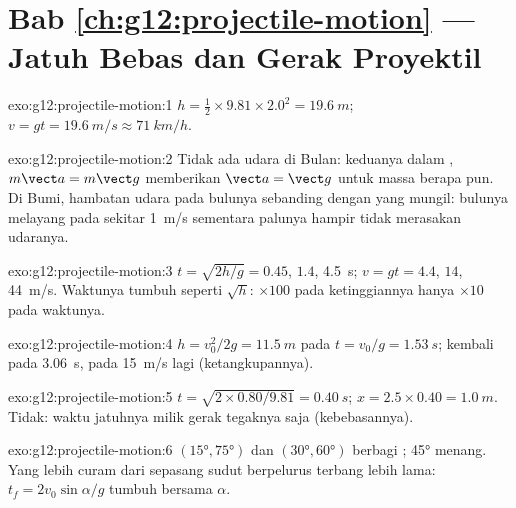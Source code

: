 \section*{Bab \ref{ch:g12:projectile-motion} --- Jatuh Bebas dan Gerak Proyektil}

\begin{solution}{exo:g12:projectile-motion:1}
$h = \tfrac12 \times 9.81 \times 2.0^2 = \qty{19.6}{m}$;
$v = gt = \qty{19.6}{m/s} \approx \qty{71}{km/h}$.
\end{solution}

\begin{solution}{exo:g12:projectile-motion:2}
Tidak ada udara di Bulan: keduanya dalam , $m\vect a = m\vect g$
memberikan $\vect a = \vect g$ untuk massa berapa pun. Di Bumi, hambatan udara
pada bulunya sebanding dengan  yang mungil: bulunya melayang pada  sekitar \qty{1}{m/s} sementara palunya hampir tidak merasakan udaranya.
\end{solution}

\begin{solution}{exo:g12:projectile-motion:3}
$t = \sqrt{2h/g} = 0.45$, $1.4$, \qty{4.5}{s};
$v = gt = 4.4$, $14$, \qty{44}{m/s}. Waktunya tumbuh seperti $\sqrt h$:
$\times 100$ pada ketinggiannya hanya $\times 10$ pada waktunya.
\end{solution}

\begin{solution}{exo:g12:projectile-motion:4}
$h = v_0^2/2g = \qty{11.5}{m}$ pada $t = v_0/g = \qty{1.53}{s}$;
kembali pada \qty{3.06}{s}, pada \qty{15}{m/s} lagi (ketangkupannya).
\end{solution}

\begin{solution}{exo:g12:projectile-motion:5}
$t = \sqrt{2 \times 0.80/9.81} = \qty{0.40}{s}$;
$x = 2.5 \times 0.40 = \qty{1.0}{m}$. Tidak: waktu jatuhnya milik
gerak tegaknya saja (kebebasannya).
\end{solution}

\begin{solution}{exo:g12:projectile-motion:6}
$(\ang{15},\ang{75})$ dan $(\ang{30},\ang{60})$ berbagi ;
\ang{45} menang. Yang lebih curam dari sepasang sudut berpelurus terbang lebih
lama: $t_f = 2v_0\sin\alpha/g$ tumbuh bersama $\alpha$.
\end{solution}

